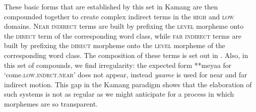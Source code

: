 \newpage
These basic forms that are established by this set in Kamang are then compounded together to create complex indirect terms in the \textsc{high} and \textsc{low} domains. N\textsc{ear} \textsc{indirect} terms are built by prefixing the \textsc{level} morpheme onto the \textsc{direct} term of the corresponding word class, while \textsc{far} \textsc{indirect} terms are built by prefixing the \textsc{direct} morpheme onto the \textsc{level} morpheme of the corresponding word class. The composition of these terms is set out in . Also, in this set of compounds, we find irregularity: the expected form **meyaa{\ng} for `come.\textsc{low.indrct.near}'  does not appear, instead \textit{yaa{\ng}me} is used for near and far indirect motion. This gap in the Kamang paradigm shows that the elaboration of such systems is not as regular as we might anticipate for a process in which morphemes are so transparent. 



